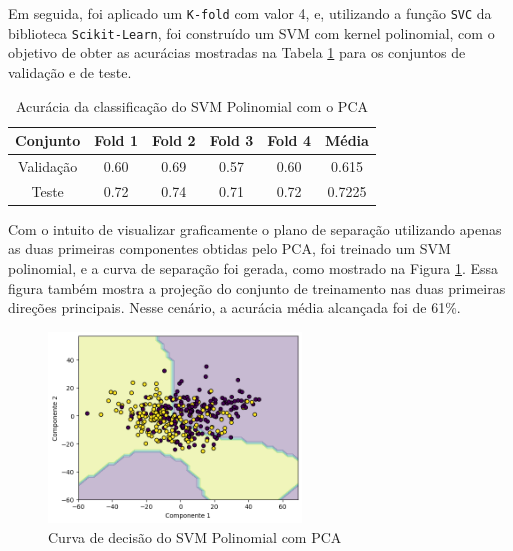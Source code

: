 \documentclass[]{abntex2}
\begin{document}
Em seguida, foi aplicado um \texttt{K-fold} com valor 4, e, utilizando a função \texttt{SVC} da biblioteca \texttt{Scikit-Learn}, foi construído um SVM com kernel polinomial, com o objetivo de obter as acurácias mostradas na Tabela \ref{tab:pca_svm} para os conjuntos de validação e de teste.

\begin{table}[H]
    \centering
    \begin{tabular}{|c|c|c|c|c|c|}
    \hline
    \rowcolor[HTML]{C0C0C0} 
    Conjunto                          & Fold 1 & Fold 2 & Fold 3 & Fold 4 & Média  \\ \hline
    \cellcolor[HTML]{C0C0C0}Validação & 0.60   & 0.69   & 0.57   & 0.60   & 0.615  \\ \hline
    \cellcolor[HTML]{C0C0C0}Teste     & 0.72   & 0.74   & 0.71   & 0.72   & 0.7225 \\ \hline
    \end{tabular}
    \caption{Acurácia da classificação do SVM Polinomial com o PCA}
    \label{tab:pca_svm}
\end{table}

Com o intuito de visualizar graficamente o plano de separação utilizando apenas as duas primeiras componentes obtidas pelo PCA, foi treinado um SVM polinomial, e a curva de separação foi gerada, como mostrado na Figura \ref{fig:pca_reta}. Essa figura também mostra a projeção do conjunto de treinamento nas duas primeiras direções principais. Nesse cenário, a acurácia média alcançada foi de 61\%.

\begin{figure}
    \centering 
    \includegraphics[width=0.6\textwidth]{imgs/ex1/pca_reta.png}
    \caption{Curva de decisão do SVM Polinomial com PCA}
    \label{fig:pca_reta} %
\end{figure}
\end{document}
